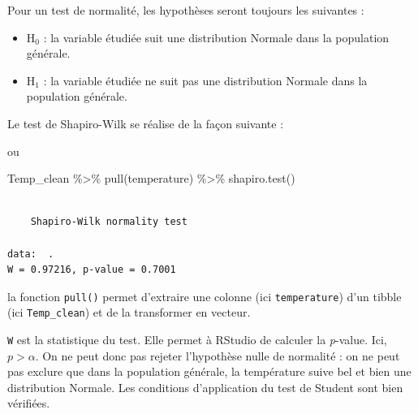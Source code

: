 \documentclass[
  a4paper,
  DIV=11,
  numbers=noendperiod,
  oneside]{scrreprt}
\newenvironment{Shaded}{}{}
\newcommand{\FunctionTok}[1]{\textcolor[rgb]{0.44,0.26,0.76}{#1}}
\newcommand{\NormalTok}[1]{\textcolor[rgb]{0.14,0.16,0.18}{#1}}
\newcommand{\SpecialCharTok}[1]{\textcolor[rgb]{0.00,0.36,0.77}{#1}}
\providecommand{\tightlist}{%
  \setlength{\itemsep}{0pt}\setlength{\parskip}{0pt}}\usepackage{longtable,booktabs,array}
\begin{document}
Pour un test de normalité, les hypothèses seront toujours les suivantes
:

\begin{itemize}
\tightlist
\item
  H\(_0\) : la variable étudiée suit une distribution Normale dans la
  population générale.
\item
  H\(_1\) : la variable étudiée ne suit pas une distribution Normale
  dans la population générale.
\end{itemize}

Le test de Shapiro-Wilk se réalise de la façon suivante :

\begin{Shaded}
\end{Shaded}

ou

\begin{Shaded}
\begin{Highlighting}[]
\NormalTok{Temp\_clean }\SpecialCharTok{\%\textgreater{}\%}
  \FunctionTok{pull}\NormalTok{(temperature) }\SpecialCharTok{\%\textgreater{}\%}
  \FunctionTok{shapiro.test}\NormalTok{()}
\end{Highlighting}
\end{Shaded}

\begin{verbatim}

    Shapiro-Wilk normality test

data:  .
W = 0.97216, p-value = 0.7001
\end{verbatim}

la fonction \texttt{pull()} permet d'extraire une colonne (ici
\texttt{temperature}) d'un tibble (ici \texttt{Temp\_clean}) et de la
transformer en vecteur.

\texttt{W} est la statistique du test. Elle permet à RStudio de calculer
la \emph{p}-value. Ici, \(p > \alpha\). On ne peut donc pas rejeter
l'hypothèse nulle de normalité : on ne peut pas exclure que dans la
population générale, la température suive bel et bien une distribution
Normale. Les conditions d'application du test de Student sont bien
vérifiées.
\end{document}

